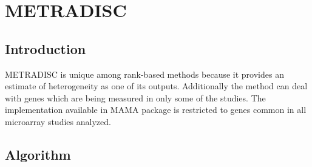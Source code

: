\documentclass[a4paper]{report}
\begin{document}
\chapter{METRADISC}
\section*{Introduction}
METRADISC \cite{Zintzaraz} is unique among rank-based methods because it provides an estimate of heterogeneity as one of its outputs. Additionally the method can deal with genes which are being measured in only some of the studies. The implementation available in MAMA package is restricted to genes common in all microarray studies analyzed.
\section*{Algorithm}
\end{document}

